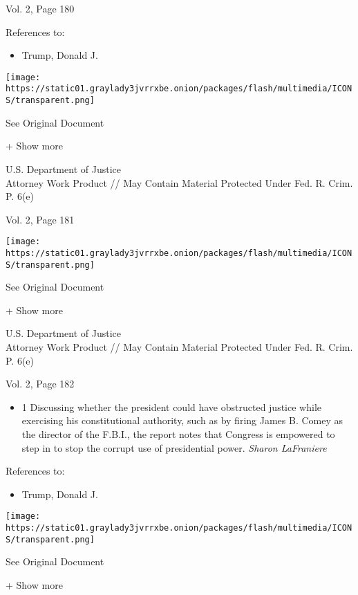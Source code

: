 Vol. 2, Page 180

References to:

\begin{itemize}
\tightlist
\item
  Trump, Donald J.
\end{itemize}

\protect\hyperlink{}{}

\texttt{[image: https://static01.graylady3jvrrxbe.onion/packages/flash/multimedia/ICONS/transparent.png]}

See Original Document

+ Show more

U.S. Department of Justice\\
Attorney Work Product // May Contain Material Protected Under Fed. R.
Crim. P. 6(e)

Vol. 2, Page 181

\protect\hyperlink{}{}

\texttt{[image: https://static01.graylady3jvrrxbe.onion/packages/flash/multimedia/ICONS/transparent.png]}

See Original Document

+ Show more

U.S. Department of Justice\\
Attorney Work Product // May Contain Material Protected Under Fed. R.
Crim. P. 6(e)

Vol. 2, Page 182

\begin{itemize}
\tightlist
\item
  1 Discussing whether the president could have obstructed justice while
  exercising his constitutional authority, such as by firing James B.
  Comey as the director of the F.B.I., the report notes that Congress is
  empowered to step in to stop the corrupt use of presidential power.
  \emph{Sharon LaFraniere}
\end{itemize}

References to:

\begin{itemize}
\tightlist
\item
  Trump, Donald J.
\end{itemize}

\protect\hyperlink{}{}

\texttt{[image: https://static01.graylady3jvrrxbe.onion/packages/flash/multimedia/ICONS/transparent.png]}

See Original Document

+ Show more

